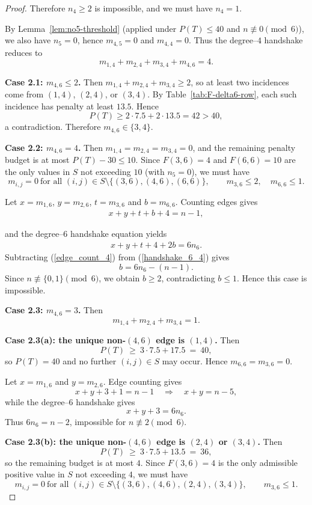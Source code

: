 \documentclass[preprint,12pt]{elsarticle}
\begin{document}
\begin{proof}
Therefore $n_4\ge 2$ is impossible, and we must have $n_4=1$.

By Lemma~\ref{lem:no5-threshold} (applied under $P(T)\le 40$ and
$n\not\equiv 0\pmod 6$), we also have $n_5=0$, hence $m_{4,5}=0$ and $m_{4,4}=0$.
Thus the degree--$4$ handshake reduces to
\[
m_{1,4}+m_{2,4}+m_{3,4}+m_{4,6}=4 .
\]


\medskip
\noindent\textbf{Case 2.1: $m_{4,6}\le 2$.}
Then $m_{1,4}+m_{2,4}+m_{3,4}\ge 2$, so at least two incidences come from
$(1,4)$, $(2,4)$, or $(3,4)$.
By Table~\ref{tab:F-delta6-row}, each such incidence has penalty at least $13.5$.
Hence
\[
P(T)\ge 2\cdot 7.5+2\cdot 13.5=42>40,
\]
a contradiction. Therefore $m_{4,6}\in\{3,4\}$.


\medskip
\noindent
\textbf{Case 2.2: $m_{4,6}=4$.}  
Then $m_{1,4}=m_{2,4}=m_{3,4}=0$, and the remaining penalty budget is at most
$P(T)-30\le 10$.  
Since $F(3,6)=4$ and $F(6,6)=10$ are the only values in $S$ not exceeding $10$
(with $n_5=0$), we must have
\[
m_{i,j}=0 \ \text{for all }(i,j)\in S\setminus\{(3,6),(4,6),(6,6)\}, \qquad
m_{3,6}\le 2, \quad m_{6,6}\le 1 .
\]

Let $x=m_{1,6}$, $y=m_{2,6}$, $t=m_{3,6}$ and $b=m_{6,6}$.  
Counting edges gives
\begin{eqnarray}
\label{edge_count_4}
  x+y+t+b+4=n-1 ,  
\end{eqnarray}

and the degree--$6$ handshake equation yields
\begin{eqnarray}
\label{handshake_6_4}
x+y+t+4+2b=6n_6 .
\end{eqnarray}
Subtracting (\ref{edge_count_4}) from (\ref{handshake_6_4}) gives
\[
b=6n_6-(n-1) .
\]
Since $n\not\equiv\{0,1\}\pmod 6$, we obtain $b\ge 2$, contradicting $b\le 1$.
Hence this case is impossible.

\medskip
\noindent
\textbf{Case 2.3: $m_{4,6}=3$.}  
Then
\[
m_{1,4}+m_{2,4}+m_{3,4}=1 .
\]

\smallskip
\noindent
\textbf{Case 2.3(a): the unique non-$(4,6)$ edge is $(1,4)$.}  
Then
\[
P(T)\ \ge\ 3\cdot 7.5 + 17.5 \ =\ 40 ,
\]
so $P(T)=40$ and no further $(i,j)\in S$ may occur.  
Hence $m_{6,6}=m_{3,6}=0$.

Let $x=m_{1,6}$ and $y=m_{2,6}$.  
Edge counting gives
\[
x+y+3+1=n-1 \quad\Rightarrow\quad x+y=n-5 ,
\]
while the degree--$6$ handshake gives
\[
x+y+3=6n_6 .
\]
Thus $6n_6=n-2$, impossible for $n\not\equiv 2\pmod 6$.

\smallskip
\noindent
\textbf{Case 2.3(b): the unique non-$(4,6)$ edge is $(2,4)$ or $(3,4)$.}  
Then
\[
P(T)\ \ge\ 3\cdot 7.5 + 13.5 \ =\ 36 ,
\]
so the remaining budget is at most $4$.  
Since $F(3,6)=4$ is the only admissible positive value in $S$ not exceeding $4$,
we must have
\[
m_{i,j}=0 \ \text{for all }(i,j)\in S\setminus\{(3,6),(4,6),(2,4),(3,4)\},
\qquad m_{3,6}\le 1 .
\]


\end{proof}
\end{document}

